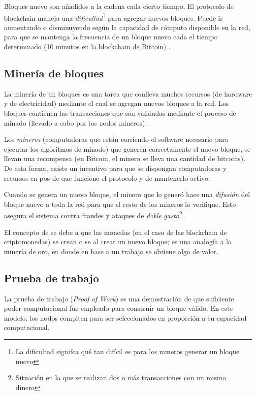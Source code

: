Bloques nuevo son añadidos a la cadena cada cierto tiempo. El protocolo de blockchain maneja una \emph{dificultad}\footnote{La dificultad signifca qué tan difícil es para los mineros generar un bloque nuevo} para agregar nuevos bloques. Puede ir aumentando o disminuyendo según la capacidad de cómputo disponible en la red, para que se mantenga la frecuencia de un bloque nuevo cada el tiempo determinado (10 minutos en la blockchain de Bitcoin) \autocite{MasteringBlockchainBlockchain}.

\subsection{Minería de bloques}

La minería de un bloques es una tarea que conlleva muchos recursos (de hardware y de electricidad) mediante el cual se agregan nuevos bloques a la red. Los bloques contienen las transacciones que son validadas mediante el proceso de minado (llevado a cabo por los nodos mineros). 

Los \emph{mineros} (computadoras que están corriendo el software necesario para ejecutar los algoritmos de minado) que generen correctamente el nuevo bloque, se llevan una recompensa (en Bitcoin, el minero se lleva una cantidad de bitcoins). De esta forma, existe un incentivo para que se dispongan computadoras y recursos en pos de que funcione el protocolo y de mantenerlo activo.

Cuando se genera un nuevo bloque, el minero que lo generó hace una \emph{difusión} del bloque nuevo a toda la red para que el resto de los mineros lo verifique. Esto asegura el sistema contra fraudes y ataques de \emph{doble gasto}\footnote{Situación en la que se realizan dos o más transacciones con un mismo dinero}. 

El concepto de  se debe a que las monedas (en el caso de las blockchain de criptomonedas) se crean o se  al crear un nuevo bloque; es una analogía a la minería de oro, en donde en base a un trabajo se obtiene algo de valor.

\subsection{Prueba de trabajo}

La prueba de trabajo (\emph{Proof of Work}) es una demostración de que suficiente poder computacional fue empleado para construir un bloque válido. En este modelo, los nodos compiten para ser seleccionados en proporción a su capacidad computacional.

